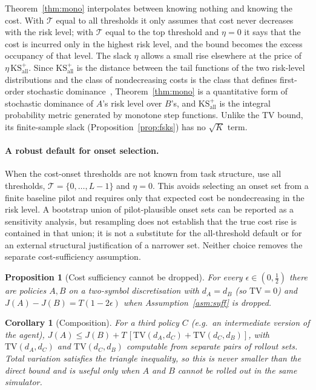 \documentclass{article}
\newtheorem{proposition}[theorem]{Proposition}
\newtheorem{corollary}[theorem]{Corollary}
\newcommand{\TV}{\mathrm{TV}}
\begin{document}
Theorem~\ref{thm:mono} interpolates between knowing nothing and knowing the cost. With $\mathcal T$ equal to all thresholds it only assumes that cost never decreases with the risk level; with $\mathcal T$ equal to the top threshold and $\eta=0$ it says that the cost is incurred only in the highest risk level, and the bound becomes the excess occupancy of that level. The slack $\eta$ allows a small rise elsewhere at the price of $\eta\,\mathrm{KS}^+_{\mathrm{all}}$. Since $\mathrm{KS}^+_{\mathrm{all}}$ is the distance between the tail functions of the two risk-level distributions and the class of nondecreasing costs is the class that defines first-order stochastic dominance~\citep{shaked2007stochastic,muller2002comparison}, Theorem~\ref{thm:mono} is a quantitative form of stochastic dominance of $A$'s risk level over $B$'s, and $\mathrm{KS}^+_{\mathrm{all}}$ is the integral probability metric generated by monotone step functions. Unlike the TV bound, its finite-sample slack (Proposition~\ref{prop:fsks}) has no $\sqrt K$ term.

\paragraph{A robust default for onset selection.} When the cost-onset thresholds are not known from task structure, use all thresholds, $\mathcal T=\{0,\ldots,L-1\}$ and $\eta=0$. This avoids selecting an onset set from a finite baseline pilot and requires only that expected cost be nondecreasing in the risk level. A bootstrap union of pilot-plausible onset sets can be reported as a sensitivity analysis, but resampling does not establish that the true cost rise is contained in that union; it is not a substitute for the all-threshold default or for an external structural justification of a narrower set. Neither choice removes the separate cost-sufficiency assumption.

\begin{proposition}[Cost sufficiency cannot be dropped]\label{prop:necessary}
For every $\epsilon\in(0,\tfrac12)$ there are policies $A,B$ on a two-symbol discretisation with $d_A=d_B$ (so $\TV=0$) and $J(A)-J(B)=T(1-2\epsilon)$ when Assumption~\ref{asm:suff} is dropped.
\end{proposition}

\begin{corollary}[Composition]\label{cor:comp}
For a third policy $C$ (e.g.\ an intermediate version of the agent), $J(A)\le J(B)+T\,[\TV(d_A,d_C)+\TV(d_C,d_B)]$, with $\TV(d_A,d_C)$ and $\TV(d_C,d_B)$ computable from separate pairs of rollout sets. Total variation satisfies the triangle inequality, so this is never smaller than the direct bound and is useful only when $A$ and $B$ cannot be rolled out in the same simulator.
\end{corollary}
\end{document}

